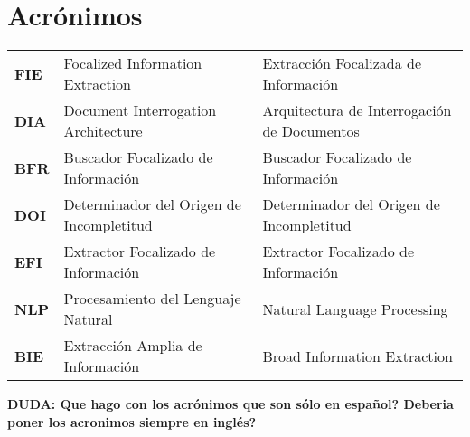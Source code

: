 \chapter*{Acrónimos}

\newcommand{\TERM}[3]{
	\textbf{#1} & #3 & #2 \\[5pt]
}

\begin{longtable}{p{1in}p{2.2in}p{3in}}

		\TERM{FIE}{Extracción Focalizada de Información}{Focalized Information Extraction}
		\TERM{DIA}{Arquitectura de Interrogación de Documentos}{Document Interrogation Architecture}
		\TERM{BFR}{Buscador Focalizado de Información}{Buscador Focalizado de Información}
		\TERM{DOI}{Determinador del Origen de Incompletitud}{Determinador del Origen de Incompletitud}		
		\TERM{EFI}{Extractor Focalizado de Información}{Extractor Focalizado de Información}
		\TERM{NLP}{Natural Language Processing}{Procesamiento del Lenguaje Natural}				
		\TERM{BIE}{Broad Information Extraction}{Extracción Amplia de Información}				

\end{longtable}

		\textbf{DUDA: Que hago con los acrónimos que son sólo en español? Deberia poner los acronimos siempre en inglés?}
		
\newpage
